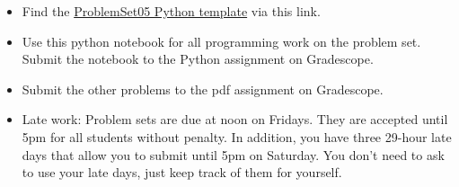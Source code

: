 \documentclass[12pt,letterpaper,noanswers]{exam}
\begin{document}
 \pdfpageheight 11in 
  \pdfpagewidth 8.5in

\begin{itemize}
    \itemsep0pt
    \item Find the \href{https://github.com/sarah1123/ScientificComputing-APMTH111/blob/main/2023Fall/PythonFiles/05_interpolation/ProblemSet05.ipynb}{ProblemSet05 Python template} via this link.
    \item Use this python notebook for all programming work on the problem set.  Submit the notebook to the Python assignment on Gradescope.
    \item Submit the other problems to the pdf assignment on Gradescope.
    \item Late work: Problem sets are due at noon on Fridays.  They are accepted until 5pm for all students without penalty.  In addition, you have three 29-hour late days that allow you to submit until 5pm on Saturday.  You don't need to ask to use your late days, just keep track of them for yourself.
\end{itemize}


\end{document}
